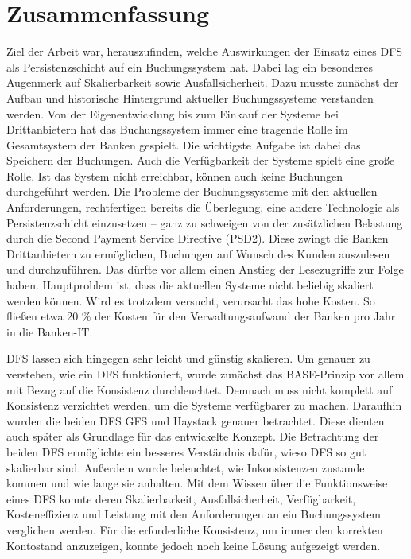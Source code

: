 \documentclass[12pt,oneside,a4paper,parskip]{scrbook}
\begin{document}
\chapter{Zusammenfassung}
Ziel der Arbeit war, herauszufinden, welche Auswirkungen der Einsatz eines DFS als Persistenzschicht auf ein Buchungssystem hat. Dabei lag ein besonderes Augenmerk auf Skalierbarkeit sowie Ausfallsicherheit. Dazu musste zunächst der Aufbau und historische Hintergrund aktueller Buchungssysteme verstanden werden. Von der Eigenentwicklung bis zum Einkauf der Systeme bei Drittanbietern hat das Buchungssystem immer eine tragende Rolle im Gesamtsystem der Banken gespielt. Die wichtigste Aufgabe ist dabei das Speichern der Buchungen. Auch die Verfügbarkeit der Systeme spielt eine große Rolle. Ist das System nicht erreichbar, können auch keine Buchungen durchgeführt werden. Die Probleme der Buchungssysteme mit den aktuellen Anforderungen, rechtfertigen bereits die Überlegung, eine andere Technologie als Persistenzschicht einzusetzen – ganz zu schweigen von der zusätzlichen Belastung durch die Second Payment Service Directive (PSD2). Diese zwingt die Banken Drittanbietern zu ermöglichen, Buchungen auf Wunsch des Kunden auszulesen und durchzuführen. Das dürfte vor allem einen Anstieg der Lesezugriffe zur Folge haben. Hauptproblem ist, dass die aktuellen Systeme nicht beliebig skaliert werden können. Wird es trotzdem versucht, verursacht das hohe Kosten. So fließen etwa 20 \% der Kosten für den Verwaltungsaufwand der Banken pro Jahr in die Banken-IT. 

DFS lassen sich hingegen sehr leicht und günstig skalieren. Um genauer zu verstehen, wie ein DFS funktioniert, wurde zunächst das BASE-Prinzip vor allem mit Bezug auf die Konsistenz durchleuchtet. Demnach muss nicht komplett auf Konsistenz verzichtet werden, um die Systeme verfügbarer zu machen. Daraufhin wurden die beiden DFS GFS und Haystack genauer betrachtet. Diese dienten auch später als Grundlage für das entwickelte Konzept. Die Betrachtung der beiden DFS ermöglichte ein besseres Verständnis dafür, wieso DFS so gut skalierbar sind. Außerdem wurde beleuchtet, wie Inkonsistenzen zustande kommen und wie lange sie anhalten. Mit dem Wissen über die Funktionsweise eines DFS konnte deren Skalierbarkeit, Ausfallsicherheit, Verfügbarkeit, Kosteneffizienz und Leistung mit den Anforderungen an ein Buchungssystem verglichen werden. Für die erforderliche Konsistenz, um immer den korrekten Kontostand anzuzeigen, konnte jedoch noch keine Lösung aufgezeigt werden.
\end{document}
